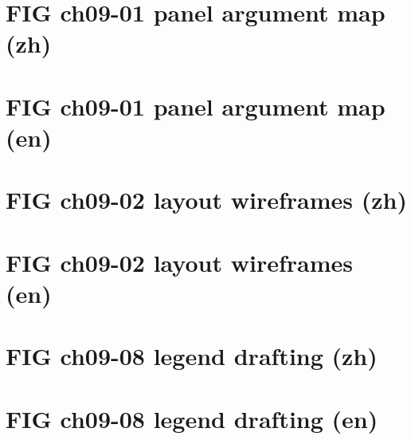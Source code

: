 \documentclass[UTF8,fontset=fandol,10pt]{ctexart}
\begin{document}
\section*{FIG ch09-01 panel argument map (zh)}

\newpage
\section*{FIG ch09-01 panel argument map (en)}

\newpage
\section*{FIG ch09-02 layout wireframes (zh)}

\newpage
\section*{FIG ch09-02 layout wireframes (en)}

\newpage
\section*{FIG ch09-08 legend drafting (zh)}

\newpage
\section*{FIG ch09-08 legend drafting (en)}

\end{document}
